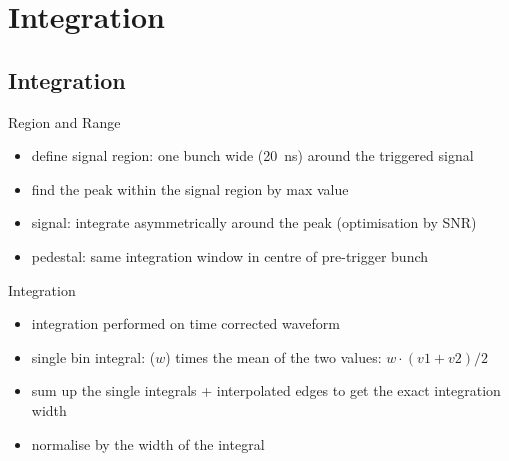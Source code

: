 \section{Integration}
\subsection{Integration}
\begin{frame}{Region and Range}

	
	
	\begin{itemize}\itemfill
		\item<2-> define signal region: one bunch wide (\SI{20}{\nano\second}) around the triggered signal
		\item<4-> find the peak within the signal region by max value
		\item<5-> signal: integrate asymmetrically around the peak (optimisation by SNR)
		\item<6-> pedestal: same integration window in centre of pre-trigger bunch
	\end{itemize}
\end{frame}
\begin{frame}{Integration}
	
	\vspace*{-15pt}
	
	\begin{itemize}\itemfill
		\item integration performed on time corrected waveform 
		\item single bin integral: ($w$) times the mean of the two values: $w\cdot(v1 + v2) / 2$
		\item sum up the single integrals + interpolated edges to get the exact integration width
		\item normalise by the width of the integral
	\end{itemize}
 
\end{frame}
